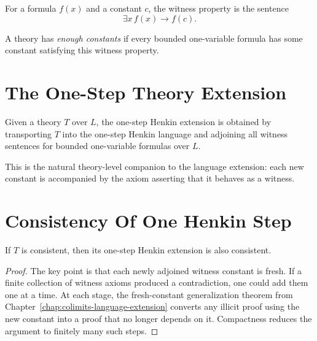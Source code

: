 \begin{definition}
\label{def:henkin-witness-property}
For a formula $f(x)$ and a constant $c$, the witness property is the sentence
\[
\exists x\, f(x) \to f(c).
\]
\end{definition}

A theory has \emph{enough constants} if every bounded one-variable formula has
some constant satisfying this witness property.

\section{The One-Step Theory Extension}

\begin{definition}
\label{def:henkin-theory-step}
Given a theory $T$ over $L$, the one-step Henkin extension is obtained by
transporting $T$ into the one-step Henkin language and adjoining all witness
sentences for bounded one-variable formulas over $L$.
\end{definition}

This is the natural theory-level companion to the language extension: each new
constant is accompanied by the axiom asserting that it behaves as a witness.

\section{Consistency Of One Henkin Step}

\begin{theorem}
\label{thm:henkin-step-consistent}
If $T$ is consistent, then its one-step Henkin extension is also consistent.
\end{theorem}

\begin{proof}
The key point is that each newly adjoined witness constant is fresh. If a
finite collection of witness axioms produced a contradiction, one could add
them one at a time. At each stage, the fresh-constant generalization theorem
from Chapter~\ref{chap:colimits-language-extension} converts any illicit proof
using the new constant into a proof that no longer depends on it. Compactness
reduces the argument to finitely many such steps.
\end{proof}

